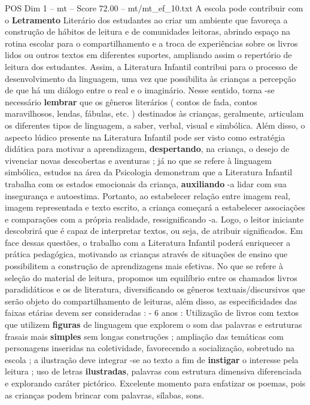 \begin{textsample}{POS Dim 1 – mt – Score 72.00 – mt/mt\_ef\_10.txt}
A escola pode contribuir com o \textbf{Letramento} Literário dos estudantes ao criar um ambiente que favoreça a construção de hábitos de leitura e de comunidades leitoras, abrindo espaço na rotina escolar para o compartilhamento e a troca de experiências sobre os livros lidos ou outros textos em diferentes suportes, ampliando assim o repertório de leitura dos estudantes.
Assim, a Literatura Infantil contribui para o processo de desenvolvimento da linguagem, uma vez que possibilita às crianças a percepção de que há um diálogo entre o real e o imaginário.
Nesse sentido, torna -se necessário \textbf{lembrar} que os gêneros literários ( contos de fada, contos maravilhosos, lendas, fábulas, etc. ) destinados às crianças, geralmente, articulam os diferentes tipos de linguagem, a saber, verbal, visual e simbólica.
Além disso, o aspecto lúdico presente na Literatura Infantil pode ser visto como estratégia didática para motivar a aprendizagem, \textbf{despertando}, na criança, o desejo de vivenciar novas descobertas e aventuras ; já no que se refere à linguagem simbólica, estudos na área da Psicologia demonstram que a Literatura Infantil trabalha com os estados emocionais da criança, \textbf{auxiliando} -a lidar com sua insegurança e autoestima.
Portanto, ao estabelecer relação entre imagem real, imagem representada e texto escrito, a criança começará a estabelecer associações e comparações com a própria realidade, ressignificando -a.
Logo, o leitor iniciante descobrirá que é capaz de interpretar textos, ou seja, de atribuir significados.
Em face dessas questões, o trabalho com a Literatura Infantil poderá enriquecer a prática pedagógica, motivando as crianças através de situações de ensino que possibilitem a construção de aprendizagens mais efetivas.
No que se refere à seleção do material de leitura, propomos um equilíbrio entre os chamados livros paradidáticos e os de literatura, diversificando os gêneros textuais/discursivos que serão objeto do compartilhamento de leituras, além disso, as especificidades das faixas etárias devem ser consideradas : - 6 anos : Utilização de livros com textos que utilizem \textbf{figuras} de linguagem que explorem o som das palavras e estruturas frasais mais \textbf{simples} sem longas construções ; ampliação das temáticas com personagens inseridas na coletividade, favorecendo a socialização, sobretudo na escola ; a ilustração deve integrar -se ao texto a fim de \textbf{instigar} o interesse pela leitura ; uso de letras \textbf{ilustradas}, palavras com estrutura dimensiva diferenciada e explorando caráter pictórico.
Excelente momento para enfatizar os poemas, pois as crianças podem brincar com palavras, sílabas, sons.

\end{textsample}

